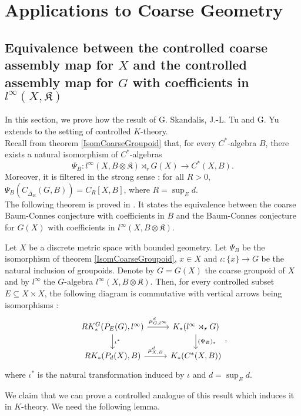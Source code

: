 \section{Applications to Coarse Geometry}

\subsection{Equivalence between the controlled coarse assembly map for $X$ and the controlled assembly map for $G$ with coefficients in $l^\infty(X,\mathfrak K)$}

In this section, we prove how the result of G. Skandalis, J.-L. Tu and G. Yu \cite{SkTuYu} extends to the setting of controlled $K$-theory. \\

Recall from theorem \ref{IsomCoarseGroupoid} that, for every $C^*$-algebra $B$, there exists a natural isomorphism of $C^*$-algebras 
\[\Psi_B : l^\infty(X,B\otimes\mathfrak K)\rtimes_r G(X)\rightarrow C^*(X,B).\]
Moreover, it is filtered in the strong sense : for all $R>0$, $\Psi_B(C_{\overline\Delta_R}(G,B))= C_R[X,B]$, where $R=\sup_E d$.\\

The following theorem is proved in \cite{SkTuYu}. It states the equivalence between the coarse Baum-Connes conjecture with coefficients in $B$ and the Baum-Connes conjecture for $G(X)$ with coefficients in $l^\infty(X,B\otimes\mathfrak K)$.  

\begin{thm}
Let $X$ be a discrete metric space with bounded geometry. Let $\Psi_B$ be the isomorphism of theorem \ref{IsomCoarseGroupoid}, $x\in X$ and $\iota :\{x\}\rightarrow G$ be the natural inclusion of groupoids. Denote by $G=G(X)$ the coarse groupoid of $X$ and by $l^\infty$ the $G$-algebra $l^\infty (X,B\otimes\mathfrak K)$. Then, for every controlled subset $E\subseteq X\times X$, the following diagram is commutative with vertical arrows being isomorphisms :
\[\begin{tikzcd}
RK_*^G(P_E(G),l^\infty) \arrow{r}{\mu_{G,l^\infty}^d}\arrow{d}{\iota^*}& K_*(l^\infty\rtimes_r G)\arrow{d}{(\Psi_B)_*}\\
RK_*(P_d(X),B) \arrow{r}{\mu_{X,B}^d}& K_*(C^*(X,B))
\end{tikzcd},\]
where $\iota^*$ is the natural transformation induced by $\iota$ and $d= \sup_E d$.
\end{thm}

We claim that we can prove a controlled analogue of this result which induces it in $K$-theory. We need the following lemma. %

